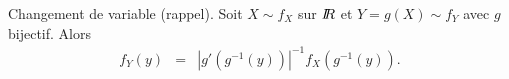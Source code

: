 \begin{proposition}{Changement de variable (rappel).}\label{changement.var}
Soit $X\sim f_X$ sur $I\!\!R$ et $Y=g(X)\sim f_Y$ avec $g$ bijectif. Alors
\begin{eqnarray*}
f_Y(y) & = & \left|g'(g^{-1}(y))\right|^{-1} f_X(g^{-1}(y)).
\end{eqnarray*}
\end{proposition}
